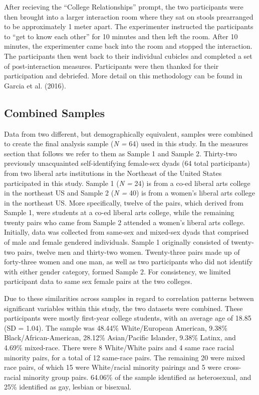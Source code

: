 \documentclass[man]{apa6}
\begin{document}
After recieving the \enquote{College Relationships} prompt, the two
participants were then brought into a larger interaction room where they
sat on stools prearranged to be approximately 1 meter apart. The
experimenter instructed the participants to \enquote{get to know each
other} for 10 minutes and then left the room. After 10 minutes, the
experimenter came back into the room and stopped the interaction. The
participants then went back to their individual cubicles and completed a
set of post-interaction measures. Participants were then thanked for
their participation and debriefed. More detail on this methodology can
be found in Garcia et al. (2016).

\subsection{Combined Samples}\label{combined-samples}

Data from two different, but demographically equivalent, samples were
combined to create the final analysis sample (\emph{N =} 64) used in
this study. In the measures section that follows we refer to them as
Sample 1 and Sample 2. Thirty-two previously unacquainted
self-identifying female-sex dyads (64 total participants) from two
liberal arts institutions in the Northeast of the United States
participated in this study. Sample 1 (\emph{N =} 24) is from a co-ed
liberal arts college in the northeast US and Sample 2 (\emph{N =} 40) is
from a women's liberal arts college in the northeast US. More
specifically, twelve of the pairs, which derived from Sample 1, were
students at a co-ed liberal arts college, while the remaining twenty
pairs who came from Sample 2 attended a women's liberal arts college.
Initially, data was collected from same-sex and mixed-sex dyads that
comprised of male and female gendered individuals. Sample 1 originally
consisted of twenty-two pairs, twelve men and thirty-two women.
Twenty-three pairs made up of forty-three women and one man, as well as
two participants who did not identify with either gender category,
formed Sample 2. For consistency, we limited participant data to same
sex female pairs at the two colleges.

Due to these similarities across samples in regard to correlation
patterns between significant variables within this study, the two
datasets were combined. These participants were mostly first-year
college students, with an average age of 18.85 (SD = 1.04). The sample
was 48.44\% White/European American, 9.38\% Black/African-American,
28.12\% Asian/Pacific Islander, 9.38\% Latinx, and 4.69\% mixed-race.
There were 8 White/White pairs and 4 same race racial minority pairs,
for a total of 12 same-race pairs. The remaining 20 were mixed race
pairs, of which 15 were White/racial minority pairings and 5 were
cross-racial minority group pairs. 64.06\% of the sample identified as
heterosexual, and 25\% identified as gay, lesbian or bisexual.
\end{document}
